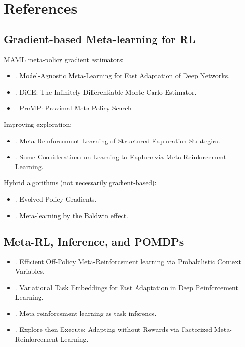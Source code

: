 \section{References}
\subsection{Gradient-based Meta-learning for RL}

\ac{MAML} meta-policy gradient estimators:
\begin{itemize}
	\item {}. Model-Agnostic Meta-Learning for Fast Adaptation of Deep Networks.
	\item {}. DiCE: The Infinitely Differentiable Monte Carlo Estimator.
	\item {}. ProMP: Proximal Meta-Policy Search.
\end{itemize}

Improving exploration:
\begin{itemize}
	\item {}. Meta-Reinforcement Learning of Structured Exploration Strategies.
	\item {}. Some Considerations on Learning to Explore via Meta-Reinforcement Learning.
\end{itemize}
	
Hybrid algorithms (not necessarily gradient-based):
\begin{itemize}
	\item {}. Evolved Policy Gradients.
	\item {}. Meta-learning by the Baldwin effect.
\end{itemize}

\subsection{Meta-RL, Inference, and POMDPs}
\begin{itemize}
	\item {}. Efficient Off-Policy Meta-Reinforcement learning via Probabilistic Context Variables.
	\item {}. Variational Task Embeddings for Fast Adaptation in Deep Reinforcement Learning.
	\item {}. Meta reinforcement learning as task inference.
	\item {}. Explore then Execute: Adapting without Rewards via Factorized Meta-Reinforcement Learning.
\end{itemize}
